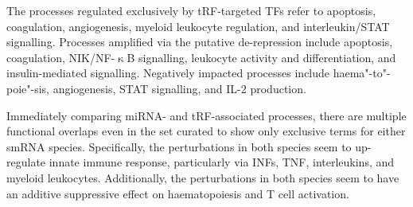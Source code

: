 The processes regulated exclusively by tRF-targeted TFs refer to apoptosis, coagulation, angiogenesis, myeloid leukocyte regulation, and interleukin/STAT signalling. Processes amplified via the putative de-repression include apoptosis, coagulation, NIK/NF-$\upkappa$B signalling, leukocyte activity and differentiation, and insulin-mediated signalling. Negatively impacted processes include haema"-to"-poie"-sis, angiogenesis, STAT signalling, and IL-2 production.

Immediately comparing miRNA- and tRF-associated processes, there are multiple functional overlaps even in the set curated to show only exclusive terms for either smRNA species. Specifically, the perturbations in both species seem to up-regulate innate immune response, particularly via INFs, TNF, interleukins, and myeloid leukocytes. Additionally, the perturbations in both species seem to have an additive suppressive effect on haematopoiesis and T cell activation.

